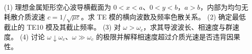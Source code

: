 (1) 理想金属矩形空心波导横截面为 \(0<x<a\)、\(0<y<b\)，\(a>b\)，内部为均匀无耗散介质波速 \(c=1/\sqrt{\mu\varepsilon}\)。求 TE 模的横向波数及频率色散关系。
(2) 确定最低截止的 TE10 模及其截止频率。
(3) 对 \(\omega>\omega_c\)，求其导波波长、相速度与群速度。
(4) 讨论 \(\omega\downarrow\omega_c\)、\(\omega\gg\omega_c\) 的极限并解释相速度超过介质光速是否违背因果性。
